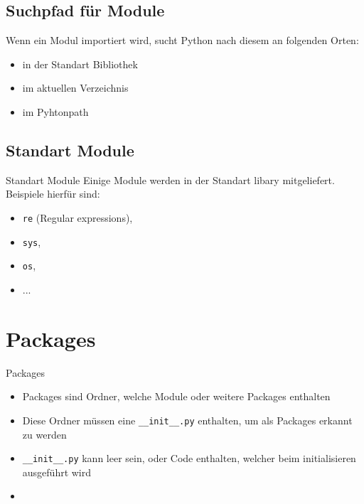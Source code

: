\begin{frame}
	
	
\end{frame}

\subsection{Suchpfad für Module}
\begin{frame}
	Wenn ein Modul importiert wird, sucht Python nach diesem an folgenden Orten:
	\begin{itemize}
		\item in der Standart Bibliothek
		\item im aktuellen Verzeichnis
		\item im Pyhtonpath
	\end{itemize}
\end{frame}

\subsection{Standart Module}
\begin{frame}{Standart Module}
	Einige Module werden in der Standart libary mitgeliefert.\\
	Beispiele hierfür sind:
	\begin{itemize}
		\item \texttt{re} (Regular expressions),
		\item \texttt{sys},
		\item \texttt{os},
		\item ...
	\end{itemize}
\end{frame}

\section{Packages}
\begin{frame}{Packages}
	\begin{itemize}
		\item Packages sind Ordner, welche Module oder weitere Packages enthalten
		\item Diese Ordner müssen eine \texttt{\_\_init\_\_.py} enthalten, um als Packages erkannt zu werden
		\item \texttt{\_\_init\_\_.py} kann leer sein, oder Code enthalten, welcher beim initialisieren ausgeführt wird
		\item 
	\end{itemize}
\end{frame}


